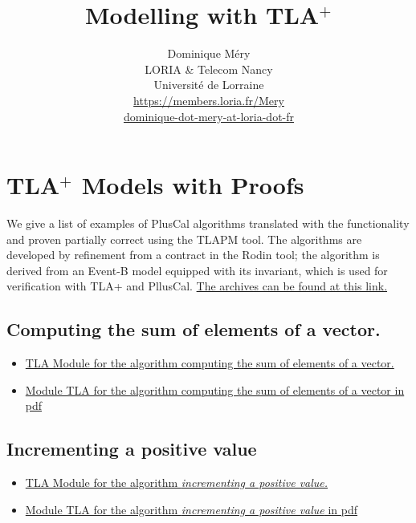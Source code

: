 \documentclass[ 12pt]{article}
\title{Modelling with TLA$^+$}
\author{Dominique M\'ery\\
LORIA \& Telecom Nancy\\ Universit\'e de Lorraine\\
\url{https://members.loria.fr/Mery}\\ \url{dominique-dot-mery-at-loria-dot-fr}}
\begin{document}
  \setcounter{ex}{1}
\maketitle



\section{TLA$^+$ Models with Proofs}
\label{sec:last-news}

We give a list of examples of   PlusCal algorithms translated with the
functionality and proven partially correct using the TLAPM tool.  The algorithms are developed  by refinement from a contract   in the Rodin tool; the algorithm  is derived from an Event-B model  equipped with its invariant, which is used for verification with TLA+ and PllusCal. \href{https://mery54.github.io/mery/eventb/}{The archives  can be found at this link.}


\subsection{ Computing the sum of elements of a vector.}
\label{sec:comp-sum-elem}


\begin{itemize}
\item[] 
  \href{https://mery54.github.io/mery/tla/TLAPROOFVECTSUM.tla}{TLA Module 
    for the algorithm  computing the sum of elements of a vector.}
\item   \href{https://mery54.github.io/mery/tla/TLAPROOFVECTSUM.pdf}{Module 
    TLA for the algorithm  computing the sum of elements of a vector
    in pdf}
    
\end{itemize}



\subsection{Incrementing a positive value}
\label{sec:comp-sum-elem}


\begin{itemize}
\item[] 
  \href{https://mery54.github.io/mery/tla/TLAPROOFINC.tla}{TLA Module 
    for the algorithm \textit{ incrementing a positive value.}}
\item   \href{https://mery54.github.io/mery/tla/TLAPROOFINC.pdf}{Module 
    TLA for the algorithm  \textit{incrementing a positive value}
    in pdf}
    
\end{itemize}
\end{document}
